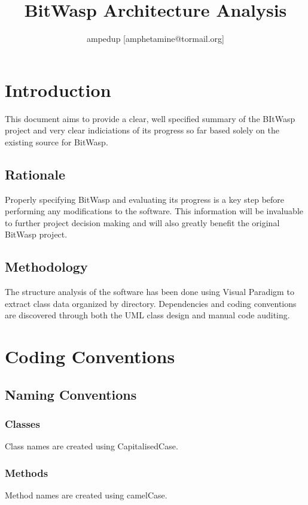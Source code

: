 \documentclass[11pt]{article} %
\title{BitWasp Architecture Analysis}
\author{ampedup [amphetamine@tormail.org]}
\date{} %
\begin{document}
\maketitle

\newpage

\tableofcontents

\newpage

\section{Introduction}

This document aims to provide a clear, well specified summary of the BItWasp project and very clear indiciations of its progress so far based solely on the existing source for BitWasp.

\subsection{Rationale}

Properly specifying BitWasp and evaluating its progress is a key step before performing any modifications to the software. This information will be invaluable to further project decision making and will also greatly benefit the original BitWasp project.

\subsection{Methodology}

The structure analysis of the software has been done using Visual Paradigm to extract class data organized by directory. Dependencies and coding conventions are discovered through both the UML class design and manual code auditing. 

\newpage

\section{Coding Conventions}
\subsection{Naming Conventions}
\subsubsection{Classes}
Class names are created using CapitalisedCase.
\subsubsection{Methods}
Method names are created using camelCase.
\end{document}
